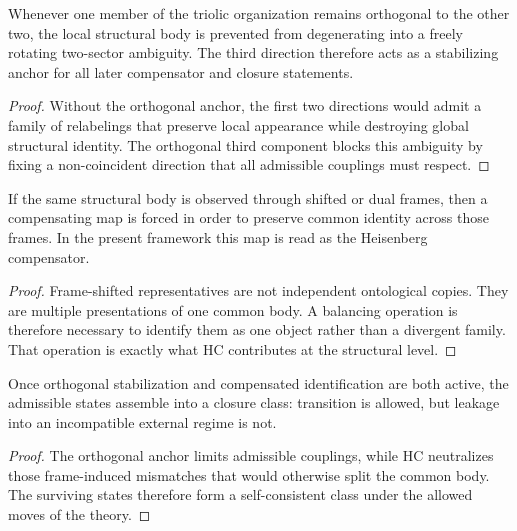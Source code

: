 \begin{lemma}
\label{lem:orthogonal-stabilization-lemma}
Whenever one member of the triolic organization remains orthogonal to the other
 two, the local structural body is prevented from degenerating into a freely
rotating two-sector ambiguity. The third direction therefore acts as a
stabilizing anchor for all later compensator and closure statements.
\end{lemma}

\begin{proof}
Without the orthogonal anchor, the first two directions would admit a family of
relabelings that preserve local appearance while destroying global structural
identity. The orthogonal third component blocks this ambiguity by fixing a
non-coincident direction that all admissible couplings must respect.
\end{proof}

\begin{lemma}
\label{lem:compensated-identification-lemma}
If the same structural body is observed through shifted or dual frames, then a
compensating map is forced in order to preserve common identity across those
frames. In the present framework this map is read as the Heisenberg
compensator.
\end{lemma}

\begin{proof}
Frame-shifted representatives are not independent ontological copies. They are
multiple presentations of one common body. A balancing operation is therefore
necessary to identify them as one object rather than a divergent family. That
operation is exactly what HC contributes at the structural level.
\end{proof}

\begin{lemma}
\label{lem:closure-class-lemma}
Once orthogonal stabilization and compensated identification are both active,
the admissible states assemble into a closure class: transition is allowed,
but leakage into an incompatible external regime is not.
\end{lemma}

\begin{proof}
The orthogonal anchor limits admissible couplings, while HC neutralizes those
frame-induced mismatches that would otherwise split the common body. The
surviving states therefore form a self-consistent class under the allowed
moves of the theory.
\end{proof}

